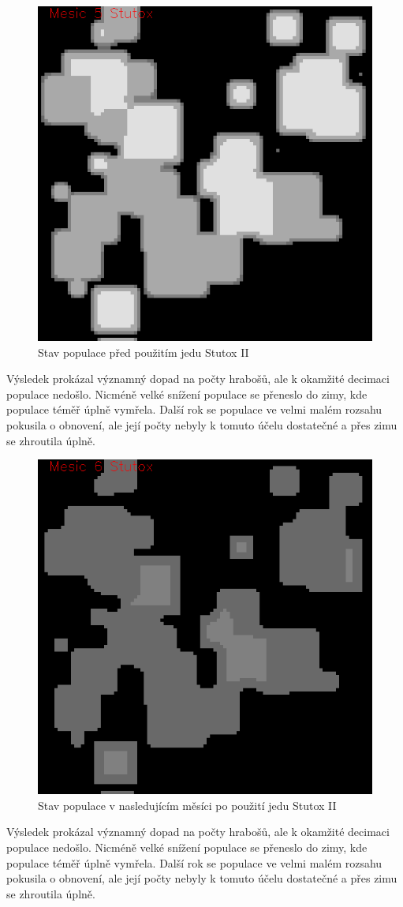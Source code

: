 \documentclass[a4paper,11pt]{article}
\begin{document}
\begin{figure}[h]
\begin{center}
    \includegraphics[width=.4\linewidth]{stutox5.png}
    \caption{Stav populace před použitím jedu Stutox II}
    \label{exp4_obr1}
\end{center}
\end{figure}

Výsledek prokázal významný dopad na počty hrabošů, ale k okamžité decimaci populace nedošlo. Nicméně velké snížení populace se přeneslo do zimy, kde populace téměř úplně vymřela. Další rok se populace ve velmi malém rozsahu pokusila o obnovení, ale její počty nebyly k tomuto účelu dostatečné a přes zimu se zhroutila úplně.

\begin{figure}[h]
\begin{center}
    \includegraphics[width=.4\linewidth]{stutox6.png}
    \caption{Stav populace v nasledujícím měsíci po použití jedu Stutox II}
    \label{exp4_obr1}
\end{center}
\end{figure}

Výsledek prokázal významný dopad na počty hrabošů, ale k okamžité decimaci populace nedošlo. Nicméně velké snížení populace se přeneslo do zimy, kde populace téměř úplně vymřela. Další rok se populace ve velmi malém rozsahu pokusila o obnovení, ale její počty nebyly k tomuto účelu dostatečné a přes zimu se zhroutila úplně.
\end{document}
